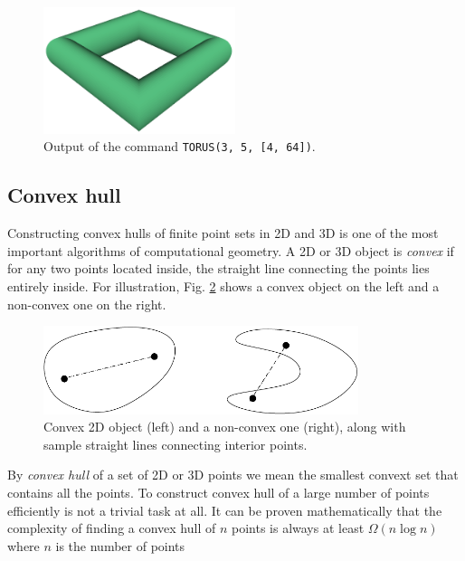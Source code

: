 \documentclass{article}
\begin{document}
\begin{figure}[!ht]
\begin{center}
\includegraphics[width=0.5\textwidth]{img/torus-5.png}
\end{center}
\vspace{-4mm}
\caption{Output of the command {\tt TORUS(3, 5, [4, 64])}.}
\label{fig:torus-5}
\end{figure}
\noindent

\subsection{Convex hull}

Constructing convex hulls of finite point sets in 2D and 3D is one of the 
most important algorithms of computational geometry. A 2D or 3D object is {\em convex} if for any 
two points located inside, the straight line connecting the points 
lies entirely inside. For illustration, Fig. \ref{fig:convex} 
shows a convex object on the left and a non-convex one on the right.
\newpage

\begin{figure}[!ht]
\begin{center}
\includegraphics[width=0.82\textwidth]{img/convex.pdf}
\end{center}
\vspace{-4mm}
\caption{Convex 2D object (left) and a non-convex one (right), along with 
         sample straight lines connecting interior points.}
\label{fig:convex}
\end{figure}
\noindent
By {\em convex hull} of a set of 2D or 3D points we mean the smallest convext 
set that contains all the points. To construct convex hull of a large number 
of points efficiently is not a trivial task at all. It can be proven 
mathematically that the complexity of finding a convex hull of $n$ points 
is always at least $Ω(n \log n)$ where $n$ is the number of points 
 
\end{document}
